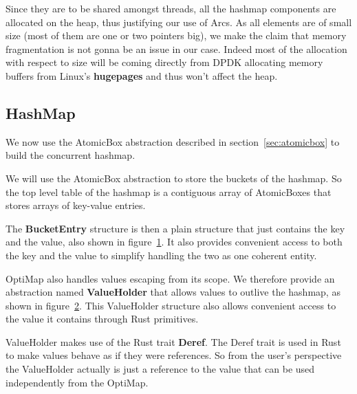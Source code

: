 Since they are to be shared amongst threads, all the hashmap
components are allocated on the heap, thus justifying our use of
Arcs. As all elements are of small size (most of them are one or two
pointers big), we make the claim that memory fragmentation is not
gonna be an issue in our case. Indeed most of the allocation with
respect to size will be coming directly from DPDK allocating memory
buffers from Linux's \textbf{hugepages} and thus won't affect the
heap.

\subsection{HashMap}

We now use the AtomicBox abstraction described in
section~\ref{sec:atomicbox} to build the concurrent hashmap.

We will use the AtomicBox abstraction to store the buckets of the
hashmap. So the top level table of the hashmap is a contiguous array
of AtomicBoxes that stores arrays of key-value entries.

\begin{figure}[htb!]
  
  \label{fig:atomicbucket}
\end{figure}

The \textbf{BucketEntry} structure is then a plain structure that just
contains the key and the value, also shown in
figure~\ref{fig:atomicbucket}. It also provides convenient access to
both the key and the value to simplify handling the two as one
coherent entity.

OptiMap also handles values escaping from its scope. We therefore
provide an abstraction named \textbf{ValueHolder} that allows values to
outlive the hashmap, as shown in figure~\ref{fig:valueholder}. This
ValueHolder structure also allows convenient access to the value it
contains through Rust primitives.

\begin{figure}[htb!]
  
  \label{fig:valueholder}
\end{figure}

ValueHolder makes use of the Rust trait \textbf{Deref}. The Deref
trait is used in Rust to make values behave as if they were
references. So from the user's perspective the ValueHolder actually is
just a reference to the value that can be used independently from the
OptiMap.

